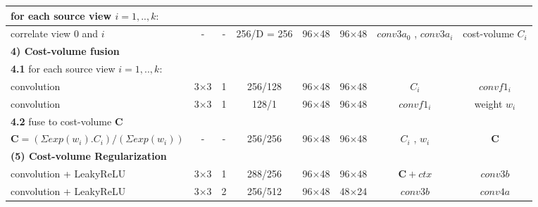 \begin{table}[htbp]
\begin{adjustbox}{width=1\textwidth}
\begin{tabular}{|l|c|c|c|c|c|c|c|}
for each source view $i = 1, .., k:$     &                 &                 &                 &                 &                 &                    &                 \\ \hline
\hspace{1cm}correlate view $0$ and $i$                 & -               & -               & 256/D = 256     & 96×48           & 96×48           & $conv3a_0$ , $conv3a_i$  & cost-volume $C_i$   \\ \hline
\hline
\rowcolor{bgcolor}
\textbf{4) Cost-volume fusion}          &                 &                 &                 &                 &                 &                    &                 \\ \hline
\textbf{4.1} for each source view $i = 1, .., k:$ &                 &                 &                 &                 &                 &                    &                 \\ \hline
\hspace{1cm}convolution                            & 3×3             & 1               & 256/128         & 96×48           & 96×48           & $C_i$                 & $convf1_i$         \\ \hline
\hspace{1cm}convolution                            & 3×3             & 1               & 128/1           & 96×48           & 96×48           & $convf1_i$            & weight $w_i$       \\ \hline
\textbf{4.2} fuse to cost-volume $\textbf{C}$               &                 &                 &                 &                 &                 &                    &                 \\ \hline
$\textbf{C} = (\Sigma exp(w_i) . C_i )/(\Sigma exp(w_i))$      & -               & -               & 256/256         & 96×48           & 96×48           & $C_i$ , $w_i$            & $\textbf{C}$               \\ \hline
\hline
\rowcolor{bgcolor}
\textbf{(5) Cost-volume Regularization} &                 &                 &                 &                 &                 &                    &                 \\ \hline
convolution + LeakyReLU                            & 3×3             & 1               & 288/256         & 96×48           & 96×48           & $\textbf{C}+ctx$              & $conv3b$          \\ \hline
convolution + LeakyReLU                            & 3×3             & 2               & 256/512         & 96×48           & 48×24           & $conv3b$             & $conv4a$          \\ \hline

\end{tabular}
\end{adjustbox}
\end{table}
